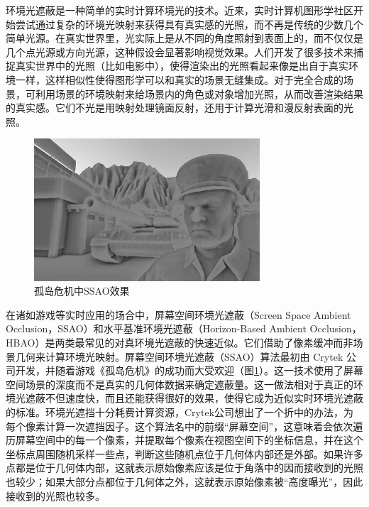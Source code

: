 \documentclass[10pt,a4paper]{article}
\theoremstyle{mythm}%
\numberwithin{equation}{section}
\begin{document}
\begin{CJK*}{UTF8}{song}
环境光遮蔽是一种简单的实时计算环境光的技术。近来，实时计算机图形学社区开始尝试通过复杂的环境光映射来获得具有真实感的光照，而不再是传统的少数几个简单光源。在真实世界里，光实际上是从不同的角度照射到表面上的，而不仅仅是几个点光源或方向光源，这种假设会显著影响视觉效果。人们开发了很多技术来捕捉真实世界中的光照（比如电影中），使得渲染出的光照看起来像是出自于真实环境一样，这样相似性使得图形学可以和真实的场景无缝集成。对于完全合成的场景，可利用场景的环境映射来给场景内的角色或对象增加光照，从而改善渲染结果的真实感。它们不光是用映射处理镜面反射，还用于计算光滑和漫反射表面的光照。

\begin{figure}[htbp]
    \vspace{-1mm}
	\centering
  	\includegraphics[width=0.75\textwidth]{fig/crytek}
    \vspace{-4mm}
  	\caption{孤岛危机中SSAO效果}
  	\label{fig:crytek}
    \vspace{-1mm}
\end{figure}

在诸如游戏等实时应用的场合中，屏幕空间环境光遮蔽（Screen Space Ambient Occlusion，SSAO）和水平基准环境光遮蔽（Horizon-Based Ambient Occlusion，HBAO）是两类最常见的对真环境光遮蔽的快速近似。它们借助了像素缓冲而非场景几何来计算环境光映射。屏幕空间环境光遮蔽（SSAO）算法最初由 Crytek 公司开发，并随着游戏《孤岛危机》的成功而大受欢迎（图\ref{fig:crytek}）。这一技术使用了屏幕空间场景的深度而不是真实的几何体数据来确定遮蔽量。这一做法相对于真正的环境光遮蔽不但速度快，而且还能获得很好的效果，使得它成为近似实时环境光遮蔽的标准。环境光遮挡十分耗费计算资源，Crytek公司想出了一个折中的办法，为每个像素计算一次遮挡因子。这个算法名中的前缀“屏幕空间”，这意味着会依次遍历屏幕空间中的每一个像素，并提取每个像素在视图空间下的坐标信息，并在这个坐标点周围随机采样一些点，判断这些随机点位于几何体内部还是外部。如果许多点都是位于几何体内部，这就表示原始像素应该是位于角落中的因而接收到的光照也较少；如果大部分点都位于几何体之外，这就表示原始像素被“高度曝光”，因此接收到的光照也较多。


\end{CJK*}
\end{document}
